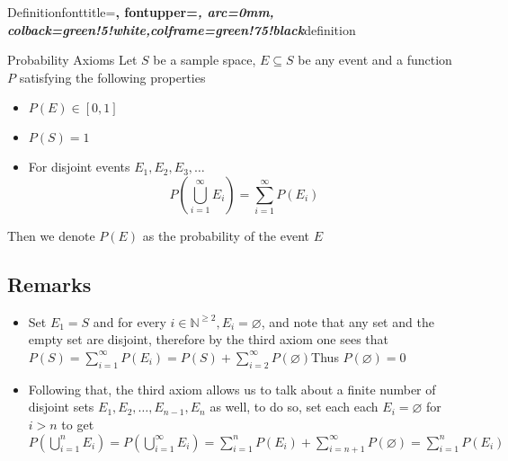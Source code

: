 \documentclass[preview]{standalone}
\begin{document}


%
  {Definition}{fonttitle=\bfseries\upshape, fontupper=\slshape,
     arc=0mm, colback=green!5!white,colframe=green!75!black}{definition}

\begin{defn*}{Probability Axioms}
Let \(S\) be a sample space, \(E \subseteq S\) be any event and a
function \(P\) satisfying the following properties

\begin{itemize}
\item
  \(P(E) \in [0,1]\)
\item
  \(P(S) = 1\)
\item
  For disjoint events \(E_1, E_2, E_3, \dots\) 
  \[
  P\left( \bigcup_{i=1}^{\infty} E_{i}\right) = \sum_{i=1}^{\infty} P\left(E_{i}\right)
\]
\end{itemize}

Then we denote \(P(E)\) as the probability of the event \(E\)

\subsection*{Remarks}

\begin{itemize}
\item
  Set \(E_{1}= S\) and for every
  \(i \in \mathbb{N} ^{ \ge 2}, E_{i} = \varnothing\), and note that any
  set and the empty set are disjoint, therefore by the third axiom one
  sees that
  \(P\left(S\right)= \sum_{i=1}^{\infty} P\left(E_{i}\right) = P\left(S\right)  +  \sum_{i=2}^{\infty} P\left( \varnothing\right)\)Thus
  \(P\left( \varnothing\right) = 0\)
\item
  Following that, the third axiom allows us to talk about a finite
  number of disjoint sets
  \(E_{1} , E_{2} , \dotsc  , E_{n - 1} , E_{n}\) as well, to do so, set
  each each \(E_{i} = \varnothing\) for \(i > n\) to get
  \(P\left( \bigcup_{i=1}^{n} E_{i}\right) = P\left( \bigcup_{i=1}^{\infty} E_{i}\right)= \sum_{i=1}^{n} P\left(E_{i}\right)  +  \sum_{i=n  +  1}^{\infty} P\left( \varnothing\right) = \sum_{i=1}^{n} P\left(E_{i}\right)\)
\end{itemize}

\end{defn*}
\end{document}
